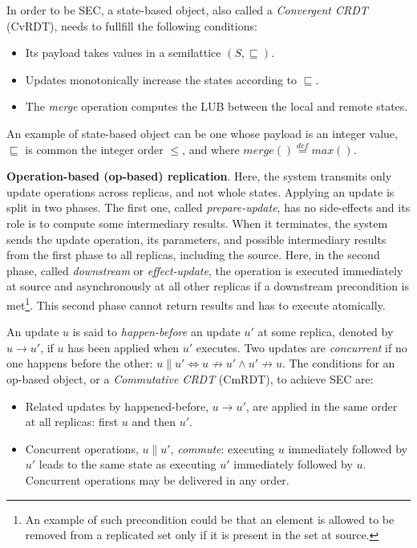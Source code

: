 In order to be SEC, a state-based object, also called a \textit{Convergent
CRDT} (CvRDT), needs to fullfill the following conditions:
\begin{itemize}
  \item Its payload takes values in a semilattice $(S,\sqsubseteq)$.
  \item Updates monotonically increase the states according to $\sqsubseteq$.
  \item The \textit{merge} operation computes the LUB between the local and
  remote states.
\end{itemize}

An example of state-based object can be one whose payload is an integer value,
$\sqsubseteq$ is common the integer order $\leq$, and where $merge()
\stackrel{def}{=} max()$.

\textbf{Operation-based (op-based) replication}. Here, the system transmits only
update operations across replicas, and not whole states. Applying an update is
split in two phases. The first one, called \textit{prepare-update}, has no
side-effects and its role is to compute some intermediary results. When it
terminates, the system sends the update operation, its parameters, and possible
intermediary results from the first phase to all replicas, including the source.
Here, in the second phase, called \textit{downstream} or \textit{effect-update},
the operation is executed immediately at source and asynchronously at all other
replicas if a downstream precondition is met\footnote{An example of such
precondition could be that an element is allowed to be removed from a replicated
set only if it is present in the set at source.}. This second phase cannot
return results and has to execute atomically.

An update $u$ is said to \textit{happen-before} an update $u'$ at some replica,
denoted by $u \rightarrow u'$, if $u$ has been applied when $u'$ executes. Two
updates are \textit{concurrent} if no one happens before the other: $u \parallel
u' \iff u \not\rightarrow u' \land u' \not\rightarrow u$. The conditions for an
op-based object, or a \textit{Commutative CRDT} (CmRDT), to achieve SEC are:
\begin{itemize}
  \item Related updates by happened-before, $u \rightarrow u'$, are applied in
  the same order at all replicas: first $u$ and then $u'$.
  \item Concurrent operations, $u \parallel u'$, \textit{commute}: executing $u$
  immediately followed by $u'$ leads to the same state as executing $u'$
  immediately followed by $u$. Concurrent operations may be delivered in any
  order.
\end{itemize}

